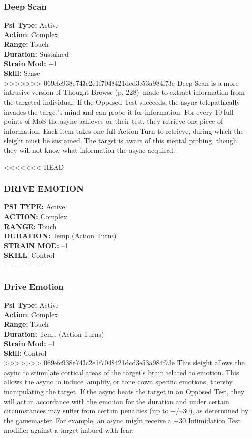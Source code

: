 \subsubsection{Deep Scan}
\textbf{Psi Type:} Active \\ 
\textbf{Action:} Complex \\ 
\textbf{Range:} Touch \\ 
\textbf{Duration:} Sustained \\
\textbf{Strain Mod:} +1 \\ 
\textbf{Skill:} Sense\\
>>>>>>> 069efc938e743c2e1f7048421dcd3e53a984f73e
Deep Scan is a more intrusive version of Thought
Browse (p. 228), made to extract information from the
targeted individual. If the Opposed Test succeeds, the
async telepathically invades the target’s mind and can
probe it for information. For every 10 full points of MoS
the async achieves on their test, they retrieve one piece
of information. Each item takes one full Action Turn to
retrieve, during which the sleight must be sustained. The
target is aware of this mental probing, though they will
not know what information the async acquired.

<<<<<<< HEAD
\subsubsection{DRIVE EMOTION}
\textbf{PSI TYPE:} Active \\ 
\textbf{ACTION:} Complex \\ 
\textbf{RANGE:} Touch \\ 
\textbf{DURATION:} Temp (Action Turns) \\
\textbf{STRAIN MOD:} –1 \\ 
\textbf{SKILL:} Control\\
=======
\subsubsection{Drive Emotion}
\textbf{Psi Type:} Active \\ 
\textbf{Action:} Complex \\ 
\textbf{Range:} Touch \\ 
\textbf{Duration:} Temp (Action Turns) \\
\textbf{Strain Mod:} –1 \\ 
\textbf{Skill:} Control\\
>>>>>>> 069efc938e743c2e1f7048421dcd3e53a984f73e
This sleight allows the async to stimulate cortical areas
of the target’s brain related to emotion. This allows
the async to induce, amplify, or tone down specific
emotions, thereby manipulating the target. If the async
beats the target in an Opposed Test, they will act in accordance
with the emotion for the duration and under
certain circumstances may suffer from certain penalties
(up to +/–30), as determined by the gamemaster. For
example, an async might receive a +30 Intimidation
Test modifier against a target imbued with fear.

